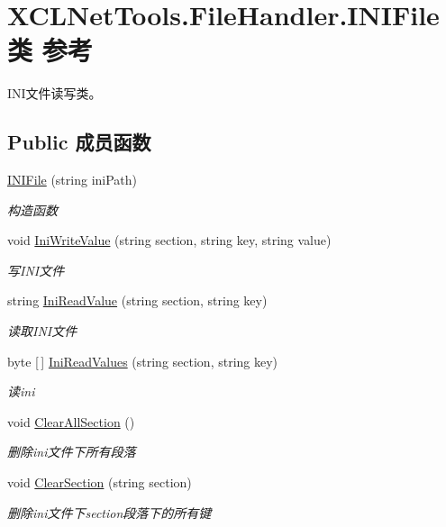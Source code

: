\hypertarget{class_x_c_l_net_tools_1_1_file_handler_1_1_i_n_i_file}{}\section{X\+C\+L\+Net\+Tools.\+File\+Handler.\+I\+N\+I\+File类 参考}
\label{class_x_c_l_net_tools_1_1_file_handler_1_1_i_n_i_file}


I\+N\+I文件读写类。  


\subsection*{Public 成员函数}
\begin{DoxyCompactItemize}
\item 
\hyperlink{class_x_c_l_net_tools_1_1_file_handler_1_1_i_n_i_file_a2a9b574a2a6b3d747e388d555daa674a}{I\+N\+I\+File} (string ini\+Path)
\begin{DoxyCompactList}\small\item\em 构造函数 \end{DoxyCompactList}\item 
void \hyperlink{class_x_c_l_net_tools_1_1_file_handler_1_1_i_n_i_file_a4c03c9b5934c36418e0f980c149bb270}{Ini\+Write\+Value} (string section, string key, string value)
\begin{DoxyCompactList}\small\item\em 写\+I\+N\+I文件 \end{DoxyCompactList}\item 
string \hyperlink{class_x_c_l_net_tools_1_1_file_handler_1_1_i_n_i_file_a7268434ca0a7510cd59a2fb374ea61c1}{Ini\+Read\+Value} (string section, string key)
\begin{DoxyCompactList}\small\item\em 读取\+I\+N\+I文件 \end{DoxyCompactList}\item 
byte \mbox{[}$\,$\mbox{]} \hyperlink{class_x_c_l_net_tools_1_1_file_handler_1_1_i_n_i_file_a10f550948e2fd9f5b0edaca05091e234}{Ini\+Read\+Values} (string section, string key)
\begin{DoxyCompactList}\small\item\em 读ini \end{DoxyCompactList}\item 
void \hyperlink{class_x_c_l_net_tools_1_1_file_handler_1_1_i_n_i_file_abbd02c3619b105f9cf2746110300c48d}{Clear\+All\+Section} ()
\begin{DoxyCompactList}\small\item\em 删除ini文件下所有段落 \end{DoxyCompactList}\item 
void \hyperlink{class_x_c_l_net_tools_1_1_file_handler_1_1_i_n_i_file_a2fbd0075aa561f98ff86705d168839bc}{Clear\+Section} (string section)
\begin{DoxyCompactList}\small\item\em 删除ini文件下section段落下的所有键 \end{DoxyCompactList}\end{DoxyCompactItemize}
